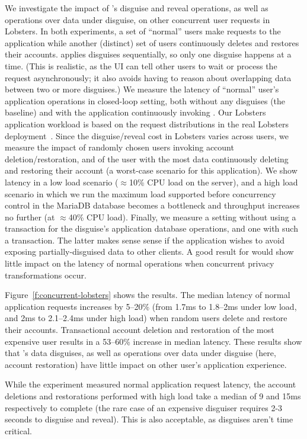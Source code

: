 %
We investigate the impact of \sys's disguise and reveal operations, as well as
operations over data under disguise, on other concurrent user requests in Lobsters.
%
In both experiments, a set of ``normal'' users make requests to the application
while another (distinct) set of users continuously deletes and restores their
accounts.
%
\sys applies disguises sequentially, so only one disguise happens at a time.
%
(This is realistic, as the UI can tell other users to wait or process the request
asynchronously; it also avoids \sys having to reason about overlapping data between
two or more disguises.)
%
We measure the latency of ``normal'' user's application operations in closed-loop
setting, both without any disguises (the baseline) and with the application
continuously invoking \sys.
%
Our Lobsters application workload is based on the request distributions in the real
Lobsters deployment~\cite{lobsters-data}.
%
Since the disguise/reveal cost in Lobsters varies across users, we measure the
impact of randomly chosen users invoking account deletion/restoration, and of
the user with the most data continuously deleting and restoring their account
(a worst-case scenario for this application).
%
We show latency in a low load scenario ($\approx$10\% CPU load on the server),
and a high load scenario in which we run the maximum load supported before
concurrency control in the MariaDB database becomes a bottleneck
and throughput increases no further (at $\approx$40\% CPU load).
%
Finally, we measure a setting without using a transaction for the disguise's
application database operations, and one with such a transaction.
%
The latter makes sense sense if the application wishes to avoid exposing
partially-disguised data to other clients.
%
A good result for \sys would show little impact on the latency of normal operations
when concurrent privacy transformations occur.
%

%
Figure~\ref{f:concurrent-lobsters} shows the results.
%
The median latency of normal application requests increases by 5--20\% (from
1.7ms to 1.8--2ms under low load, and 2ms to 2.1--2.4ms under high load) when
random users delete and restore their accounts.
%
Transactional account deletion and restoration of the most expensive user
results in a 53--60\% increase in median latency.
%
These results show that \sys's data disguises, as well as operations over
data under disguise (here, account restoration) have little impact on
other user's application experience.
%

%
While the experiment measured normal application request latency, the
account deletions and restorations performed with high load take a median of 9 and 15ms
respectively to
complete (the rare case of an expensive disguiser requires 2-3 seconds to disguise and reveal). 
%
This is also acceptable, as disguises aren't time critical.
%
